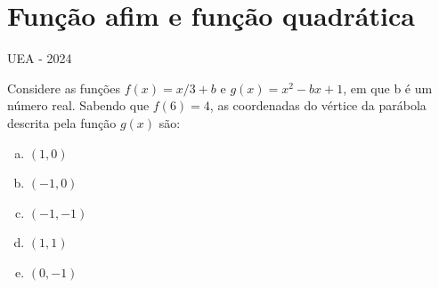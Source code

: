 \documentclass[11pt]{beamer}
\begin{document}
\section{Função afim e função quadrática}
\begin{frame}{UEA - 2024}

    Considere as funções $f(x)={x}/{3}+b$ e $g(x)=x^{2}-bx+1$, em que b é um número real. Sabendo que $f(6)=4$, as coordenadas do vértice da parábola descrita pela função $g(x)$ são:

    \begin{enumerate}[a)]
        \item $(1,0)$ %
        \item $(-1,0)$
        \item $(-1,-1)$
        \item $(1,1)$ 
        \item $(0,-1)$
    \end{enumerate}

\end{frame}
\end{document}
